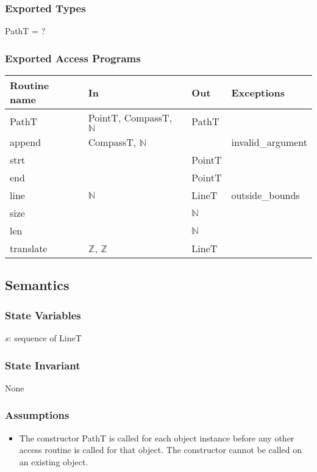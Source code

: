 \documentclass[12pt]{article}
\begin{document}
\subsubsection* {Exported Types}

PathT = ?

\subsubsection* {Exported Access Programs}

\begin{tabular}{| l | l | l | l |}
\hline
\textbf{Routine name} & \textbf{In} & \textbf{Out} & \textbf{Exceptions}\\
\hline
PathT & PointT, CompassT, $\mathbb{N}$ & PathT & \\ %
\hline
append & CompassT, $\mathbb{N}$ & & invalid\_argument\\ 
\hline
strt & ~ & PointT & ~\\
\hline
end & ~ & PointT & ~\\
\hline
line & $\mathbb{N}$ & LineT & outside\_bounds\\
\hline
size & ~ & $\mathbb{N}$ & \\
\hline
 len & ~ & $\mathbb{N}$ & ~\\
\hline
translate & $\mathbb{Z}$, $\mathbb{Z}$ & LineT  & ~\\
\hline
\end{tabular}

\subsection* {Semantics}

\subsubsection* {State Variables}

$s$: sequence of LineT

\subsubsection* {State Invariant}

None

\subsubsection* {Assumptions}

\begin{itemize}
\item The constructor PathT is called for each object instance before any other
access routine is called for that object.  The constructor cannot be called on
an existing object.
\end{itemize}
\end{document}
